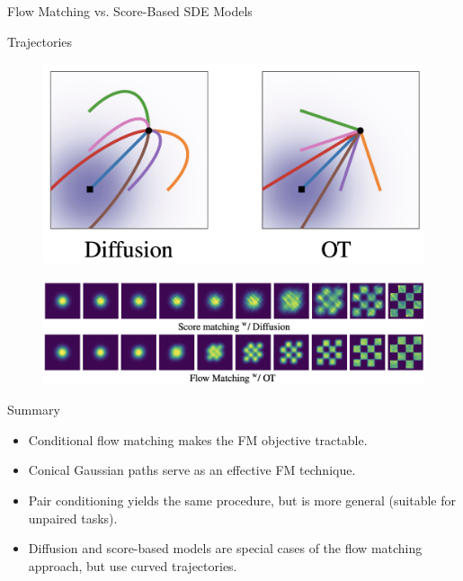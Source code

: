 \documentclass{beamer}
\begin{document}
\begin{frame}{Flow Matching vs. Score-Based SDE Models}
	\begin{block}{Trajectories}
		\vspace{-0.3cm}
		\begin{figure}
			\centering
			\includegraphics[width=0.6\linewidth]{figs/trajectories}
		\end{figure}
		\vspace{-0.3cm}
	\end{block}
	\eqpause
	\begin{figure}
		\centering
		\includegraphics[width=\linewidth]{figs/2d-generation}
	\end{figure}
\end{frame}
\begin{frame}{Summary}
	\begin{itemize}
		\item Conditional flow matching makes the FM objective tractable.
		\vfill
		\item Conical Gaussian paths serve as an effective FM technique.
		\vfill
		\item Pair conditioning yields the same procedure, but is more general (suitable for unpaired tasks).
		\vfill
		\item Diffusion and score-based models are special cases of the flow matching approach, but use curved trajectories.
	\end{itemize}
\end{frame}
\end{document}
